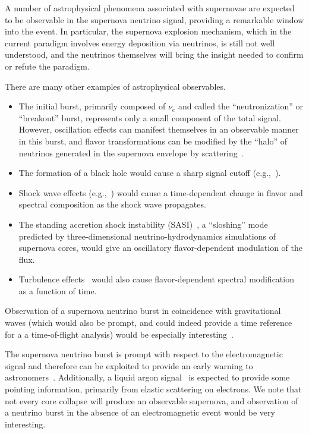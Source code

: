 A number of astrophysical phenomena associated with supernovae are expected to be observable
in the supernova neutrino signal, providing a remarkable window into the event.  In particular, the supernova explosion mechanism, which in the current paradigm involves energy deposition via neutrinos, is still not well understood, and the neutrinos themselves will bring the insight needed to confirm or refute the paradigm.

There are many other examples of astrophysical observables.
\begin{itemize}
\item The initial burst, primarily composed of $\nu_e$ and called the
  ``neutronization'' or ``breakout''
  burst, 
  represents only a small component of the total signal.  However,
  oscillation effects can manifest themselves in an observable manner
  in this burst, and flavor transformations can be modified by the
  ``halo'' of neutrinos generated in the supernova envelope by
  scattering~\cite{Cherry:2013mv}.
\item The formation of a black hole would cause a sharp signal cutoff
  (e.g.,~\cite{Beacom:2000qy,Fischer:2008rh}).
\item Shock wave effects (e.g.,~\cite{Schirato:2002tg}) would cause a
  time-dependent change in flavor and spectral composition as the
  shock wave propagates.
\item The standing accretion shock instability
  (SASI)~\cite{Hanke:2011jf,Hanke:2013ena}, a ``sloshing'' mode
  predicted by three-dimensional neutrino-hydrodynamics simulations of
  supernova cores, would give an oscillatory flavor-dependent
  modulation of the flux.
\item Turbulence effects~\cite{Friedland:2006ta,Lund:2013uta} would
  also cause flavor-dependent spectral modification as a function of
  time.
\end{itemize}

Observation of a supernova neutrino burst in coincidence with gravitational waves (which would also be prompt, and could indeed provide a time reference for a a time-of-flight analysis) would be especially interesting~\cite{Arnaud:2003zr,Ott:2012jq, Mueller:2012sv, Nishizawa:2014zna}.

The supernova neutrino burst is prompt with respect to the
electromagnetic signal and therefore can be exploited to provide an
early warning to astronomers~\cite{Antonioli:2004zb,Scholberg:2008fa}.  
Additionally, a liquid argon signal~\cite{Bueno:2003ei} is expected to
provide some pointing information, primarily from elastic scattering
on electrons.
We note that not every core collapse will produce an observable supernova, and observation of a neutrino burst in the absence of an electromagnetic event would be very interesting. 

